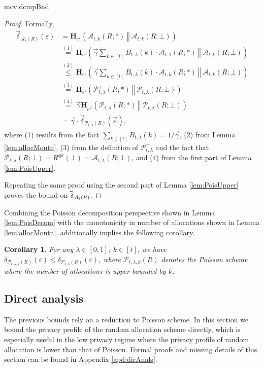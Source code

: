 \documentclass{article}
\theoremstyle{plain}
\newtheorem{corollary}[theorem]{Corollary}
\theoremstyle{definition}
\newcommand{\eps}{\varepsilon}
\newcommand{\eqExp}[2]{\overset{(#1)}{#2}}
\newcommand{\lvec}[1]{\reflectbox{$\vec{\reflectbox{$#1$}}$}}
\newcommand{\rand}{R}
\newcommand{\HockeyStick}[1]{\boldsymbol{H}_{#1}}
\newcommand{\HockeyStickDiv}[3]{\HockeyStick{#1}\left(#2 ~\left\Vert~ #3 \right. \right)}
\newcommand{\Pois}[2]{\mathcal{P}_{#1}\left(#2\right)}
\newcommand{\PoisFunc}[3]{\mathcal{P}_{#1}\left(#2; #3\right)}
\newcommand{\alloc}[2]{\mathcal{A}_{#1}\left(#2\right)}
\newcommand{\allocFunc}[3]{\mathcal{A}_{#1}\left(#2; #3\right)}
\newcommand{\add}[1]{\lvec{#1}}
\newcommand{\rem}[1]{\vec{#1}}
\newcommand{\privProf}[1]{\delta_{#1}}
\newcommand{\privProfAdd}[1]{\add{\delta}_{#1}}
\newcommand{\privProfRem}[1]{\rem{\delta}_{#1}}
\begin{document}
\begin{movable}{mov:dcmpBnd}{}
\begin{proof}
    Formally, 
    \begin{align*}
        \privProfRem{\alloc{t}{\rand}}(\eps) & = \HockeyStickDiv{e^{\eps}}{\allocFunc{t, k}{\rand}{*}}{\allocFunc{t, k}{\rand}{\bot}}
        \\ & \eqExp{1}{=} \HockeyStickDiv{e^{\eps}}{\rem{\gamma} \sum_{k \in [t]} B_{t, \lambda}(k) \cdot \allocFunc{t, 1}{\rand}{*}}{\allocFunc{t, k}{\rand}{\bot}}
        \\ & \eqExp{2}{\le} \HockeyStickDiv{e^{\eps}}{\rem{\gamma} \sum_{k \in [t]} B_{t, \lambda}(k)\cdot \allocFunc{t, k}{\rand}{*}}{\allocFunc{t, k}{\rand}{\bot}}
        \\ & \eqExp{3}{=} \HockeyStickDiv{e^{\eps}}{\mathcal{P}_{t, \lambda}^{+}(\rand; *)}{\mathcal{P}_{t, \lambda}^{+}(\rand; \bot)}
        \\ & \eqExp{4}{=} \rem{\gamma} \HockeyStickDiv{e^{\rem{\eps}}}{\PoisFunc{t, \lambda}{\rand}{*}}{\PoisFunc{t, \lambda}{\rand}{\bot}}
        \\ & = \rem{\gamma} \cdot \privProfRem{\Pois{t, \lambda}{\rand}}(\rem{\eps}),
    \end{align*}
    where (1) results from the fact $\sum_{k \in [t]} B_{t, \lambda}(k) = 1/\rem{\gamma}$, (2) from Lemma \ref{lem:allocMontn}, (3) from the definition of $\mathcal{P}_{t, \lambda}^{+}$ and the fact that $\PoisFunc{t, \lambda}{\rand}{\bot} = \rand^{\otimes t}(\bot) = \allocFunc{t, \lambda}{\rand}{\bot}$, and (4) from the first part of Lemma \ref{lem:PoisUpper}.
    
    Repeating the same proof using the second part of Lemma \ref{lem:PoisUpper} proves the bound on $\privProfAdd{\alloc{t}{\rand}}$.
\end{proof}

Combining the Poisson decomposition perspective shown in Lemma \ref{lem:PoisDecom} with the monotonicity in number of allocations shown in Lemma \ref{lem:allocMontn}, additionally implies the following corollary.
\begin{corollary}\label{cor:TruncPois}
    For any $\lambda \in [0, 1]$; $k \in [t]$, we have $\privProf{\Pois{t, \lambda, k}{\rand}}(\eps) \le \privProf{\Pois{t, \lambda}{\rand}}(\eps)$, where $\Pois{t, \lambda, k}{\rand}$ denotes the Poisson scheme where the number of allocations is upper bounded by $k$.
\end{corollary}
\end{movable}

\subsection{Direct analysis}\label{sec:dirAnals}
The previous bounds rely on a reduction to Poisson scheme. In this section we bound the privacy profile of the random allocation scheme directly, which is especially useful in the low privacy regime where the privacy profile of random allocation is lower than that of Poisson. Formal proofs and missing details of this section can be found in Appendix \ref{apd:dirAnals}.
\end{document}
